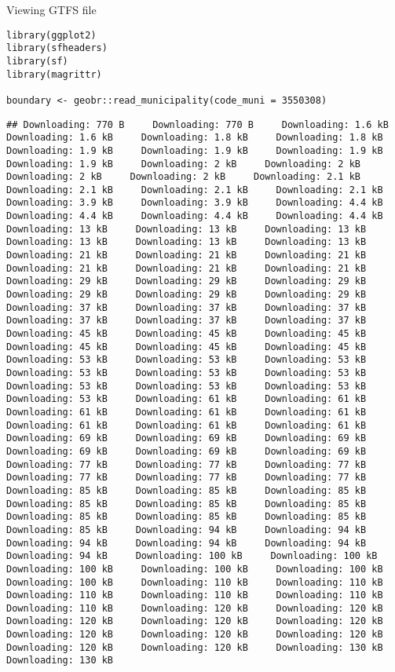 \documentclass[gc, manuscript]{copernicus}
\begin{document}
Viewing GTFS file

\begin{verbatim}
library(ggplot2)
library(sfheaders)
library(sf)
library(magrittr)

boundary <- geobr::read_municipality(code_muni = 3550308)
\end{verbatim}

\begin{verbatim}
## Downloading: 770 B     Downloading: 770 B     Downloading: 1.6 kB     Downloading: 1.6 kB     Downloading: 1.8 kB     Downloading: 1.8 kB     Downloading: 1.9 kB     Downloading: 1.9 kB     Downloading: 1.9 kB     Downloading: 1.9 kB     Downloading: 2 kB     Downloading: 2 kB     Downloading: 2 kB     Downloading: 2 kB     Downloading: 2.1 kB     Downloading: 2.1 kB     Downloading: 2.1 kB     Downloading: 2.1 kB     Downloading: 3.9 kB     Downloading: 3.9 kB     Downloading: 4.4 kB     Downloading: 4.4 kB     Downloading: 4.4 kB     Downloading: 4.4 kB     Downloading: 13 kB     Downloading: 13 kB     Downloading: 13 kB     Downloading: 13 kB     Downloading: 13 kB     Downloading: 13 kB     Downloading: 21 kB     Downloading: 21 kB     Downloading: 21 kB     Downloading: 21 kB     Downloading: 21 kB     Downloading: 21 kB     Downloading: 29 kB     Downloading: 29 kB     Downloading: 29 kB     Downloading: 29 kB     Downloading: 29 kB     Downloading: 29 kB     Downloading: 37 kB     Downloading: 37 kB     Downloading: 37 kB     Downloading: 37 kB     Downloading: 37 kB     Downloading: 37 kB     Downloading: 45 kB     Downloading: 45 kB     Downloading: 45 kB     Downloading: 45 kB     Downloading: 45 kB     Downloading: 45 kB     Downloading: 53 kB     Downloading: 53 kB     Downloading: 53 kB     Downloading: 53 kB     Downloading: 53 kB     Downloading: 53 kB     Downloading: 53 kB     Downloading: 53 kB     Downloading: 53 kB     Downloading: 53 kB     Downloading: 61 kB     Downloading: 61 kB     Downloading: 61 kB     Downloading: 61 kB     Downloading: 61 kB     Downloading: 61 kB     Downloading: 61 kB     Downloading: 61 kB     Downloading: 69 kB     Downloading: 69 kB     Downloading: 69 kB     Downloading: 69 kB     Downloading: 69 kB     Downloading: 69 kB     Downloading: 77 kB     Downloading: 77 kB     Downloading: 77 kB     Downloading: 77 kB     Downloading: 77 kB     Downloading: 77 kB     Downloading: 85 kB     Downloading: 85 kB     Downloading: 85 kB     Downloading: 85 kB     Downloading: 85 kB     Downloading: 85 kB     Downloading: 85 kB     Downloading: 85 kB     Downloading: 85 kB     Downloading: 85 kB     Downloading: 94 kB     Downloading: 94 kB     Downloading: 94 kB     Downloading: 94 kB     Downloading: 94 kB     Downloading: 94 kB     Downloading: 100 kB     Downloading: 100 kB     Downloading: 100 kB     Downloading: 100 kB     Downloading: 100 kB     Downloading: 100 kB     Downloading: 110 kB     Downloading: 110 kB     Downloading: 110 kB     Downloading: 110 kB     Downloading: 110 kB     Downloading: 110 kB     Downloading: 120 kB     Downloading: 120 kB     Downloading: 120 kB     Downloading: 120 kB     Downloading: 120 kB     Downloading: 120 kB     Downloading: 120 kB     Downloading: 120 kB     Downloading: 120 kB     Downloading: 120 kB     Downloading: 130 kB     Downloading: 130 kB     
\end{verbatim}
\end{document}

